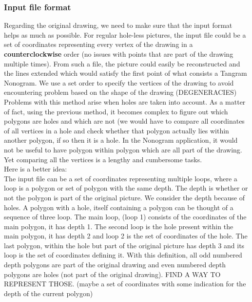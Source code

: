 \documentclass{article}
\begin{document}
\subsubsection{Input file format}

Regarding the original drawing, we need to make sure that the input format helps as much as possible. For regular hole-less pictures, the input file could be a set of coordinates representing every vertex of the drawing in a {\bf counterclockwise} order (no issues with points that are part of the drawing multiple times). From such a file, the picture could easily be reconstructed and the lines extended which would satisfy the first point of what consists a Tangram Nonogram. We use a set order to specify the vertices of the drawing to avoid encountering problem based on the shape of the drawing (DEGENERACIES)\\

Problems with this method arise when holes are taken into account. As a matter of fact, using the previous method, it becomes complex to figure out which polygons are holes and which are not (we would have to compare all coordinates of all vertices in a hole and check whether that polygon actually lies within another polygon, if so then it is a hole. In the Nonogram application, it would not be useful to have polygon within polygon which are all part of the drawing. Yet comparing all the vertices is a lengthy and cumbersome tasks.\\ 

Here is a better idea:\\

The input file can be a set of coordinates representing multiple loops, where a loop is a polygon or set of polygon with the same depth. The depth is whether or not the polygon is part of the original picture. We consider the depth because of holes. A polygon with a hole, itself containing a polygon can be thought of a sequence of three loop. The main loop, (loop 1) consists of the coordinates of the main polygon, it has depth 1. The second loop is the hole present within the main polygon, it has depth 2 and loop 2 is the set of coordinates of the hole. The last polygon, within the hole but part of the original picture has depth 3 and its loop is the set of coordinates defining it. With this definition, all odd numbered depth polygons are part of the original drawing and even numbered depth polygons are holes (not part of the original drawing). FIND A WAY TO REPRESENT THOSE. (maybe a set of coordinates with some indication for the depth of the current polygon)\\
\end{document}
